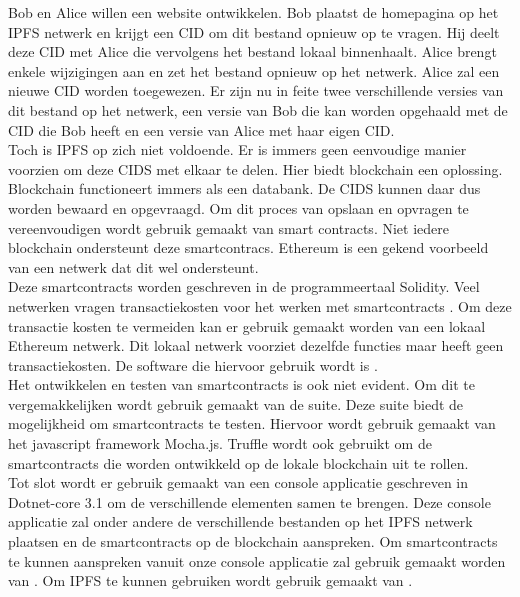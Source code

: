Bob en Alice willen een website ontwikkelen. Bob plaatst de homepagina op het IPFS netwerk en krijgt een CID om dit bestand opnieuw op te vragen. Hij deelt deze CID met Alice die vervolgens het bestand lokaal binnenhaalt. Alice brengt enkele wijzigingen aan en zet het bestand opnieuw op het netwerk. Alice zal een nieuwe CID worden toegewezen. Er zijn nu in feite twee verschillende versies van dit bestand op het netwerk, een versie van Bob die kan worden opgehaald met de CID die Bob heeft en een versie van Alice met haar eigen CID.\\

Toch is IPFS op zich niet voldoende. Er is immers geen eenvoudige manier voorzien om deze CIDS met elkaar te delen. Hier biedt blockchain een oplossing. Blockchain functioneert immers als een databank. De CIDS kunnen daar dus worden bewaard en opgevraagd. Om dit proces van opslaan en opvragen te vereenvoudigen wordt gebruik gemaakt van smart contracts. Niet iedere blockchain ondersteunt deze smartcontracs. Ethereum is een gekend voorbeeld van een netwerk dat dit wel ondersteunt.\\

Deze smartcontracts worden geschreven in de programmeertaal Solidity. Veel netwerken vragen transactiekosten voor het werken met smartcontracts . Om deze transactie kosten te vermeiden kan er gebruik gemaakt worden van een lokaal Ethereum netwerk. Dit lokaal netwerk voorziet dezelfde functies maar heeft geen transactiekosten. De software die hiervoor gebruik wordt is \textcite{Ganache}.\\

Het ontwikkelen en testen van smartcontracts is ook niet evident. Om dit te vergemakkelijken wordt gebruik gemaakt van de \textcite{Truffle} suite. Deze suite biedt de mogelijkheid om smartcontracts te testen. Hiervoor wordt gebruik gemaakt van het javascript framework Mocha.js. Truffle wordt ook gebruikt om de smartcontracts die worden ontwikkeld op de lokale blockchain uit te rollen.\\

Tot slot wordt er gebruik gemaakt van een console applicatie geschreven in Dotnet-core 3.1 om de verschillende elementen samen te brengen. Deze console applicatie zal onder andere de verschillende bestanden op het IPFS netwerk plaatsen en de smartcontracts op de blockchain aanspreken. Om smartcontracts te kunnen aanspreken vanuit onze console applicatie zal gebruik gemaakt worden van \textcite{Nethereum}. Om IPFS te kunnen gebruiken wordt gebruik gemaakt van \textcite{IPFSClient}.\\

